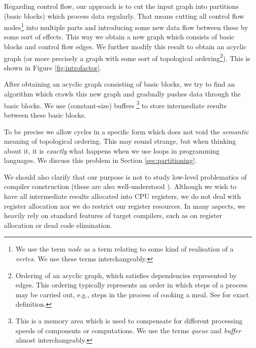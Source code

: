   Regarding control flow, our approach is to cut the input graph into partitions (basic blocks) which process data regularly. That means cutting all control flow nodes\footnote{We use the term \emph{node} as a term relating to some kind of realisation of a \emph{vertex}. We use these terms interchangeably. } into multiple parts and introducing some new data flow between these by some sort of effects. This way we obtain a new graph which consists of basic blocks and control flow edges. We further modify this result to obtain an acyclic graph (or more precisely a graph with some sort of topological ordering\footnote{Ordering of an acyclic graph, which satisfies dependencies represented by edges. This ordering typically represents an order in which steps of a process may be carried out, e.g., steps in the process of cooking a meal. See \cite{chapters} for exact definition.}). This is shown in Figure \ref{fig:introfactor}.


  After obtaining an acyclic graph consisting of basic blocks, we try to find an algorithm which crawls this new graph and gradually pushes data through the basic blocks. We use (constant-size) buffers \footnote{This is a memory area which is used to compensate for different processing speeds of components or computations. We use the terms \emph{queue} and \emph{buffer} almost interchangeably.} to store intermediate results between these basic blocks.


\begin{rem}
  To be precise we allow cycles in a specific form which does not void the \emph{semantic} meaning of topological ordering. This may sound strange, but when thinking about it, it is \emph{exactly} what happens when we use loops in programming languages. We discuss this problem in Section \ref{sec:partitioning}.
\end{rem}

  \FloatBarrier

  We should also clarify that our purpose is not to study low-level problematics of compiler construction (these are also well-understood \cite{compilers}). Although we wish to have all intermediate results allocated into CPU registers, we do not deal with register allocation nor we do restrict our register resources. In many aspects, we heavily rely on standard features of target compilers, such as on register allocation or dead code elimination.

